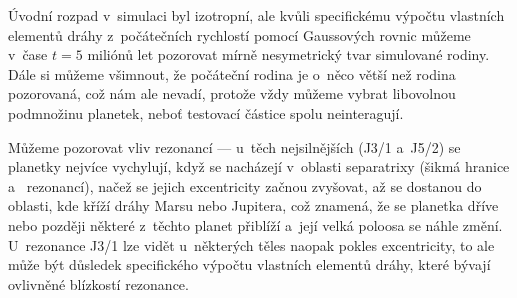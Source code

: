 \documentclass[A4paper, 12pt, oneside]{book}
\begin{document}
Úvodní rozpad v~simulaci byl izotropní, ale kvůli specifickému výpočtu vlastních elementů dráhy z~počátečních rychlostí pomocí Gaussových rovnic můžeme v~čase $t=5$ miliónů let pozorovat mírně nesymetrický tvar simulované rodiny. Dále si můžeme všimnout, že počáteční rodina je o~něco větší než rodina pozorovaná, což nám ale nevadí, protože vždy můžeme vybrat libovolnou podmnožinu planetek, neboť testovací částice spolu neinteragují.

Můžeme pozorovat vliv rezonancí --- u~těch nejsilnějších (J3/1 a~J5/2) se planetky nejvíce vychylují, když se nacházejí v~oblasti separatrixy (šikmá hranice  a~ rezonancí), načež se jejich excentricity začnou zvyšovat, až se dostanou do oblasti, kde kříží dráhy Marsu nebo Jupitera, což znamená, že se planetka dříve nebo později některé z~těchto planet přiblíží a~její velká poloosa se náhle změní. U~rezonance J3/1 lze vidět u~některých těles naopak pokles excentricity, to ale může být důsledek specifického výpočtu vlastních elementů dráhy, které bývají ovlivněné blízkostí rezonance.
\end{document}
